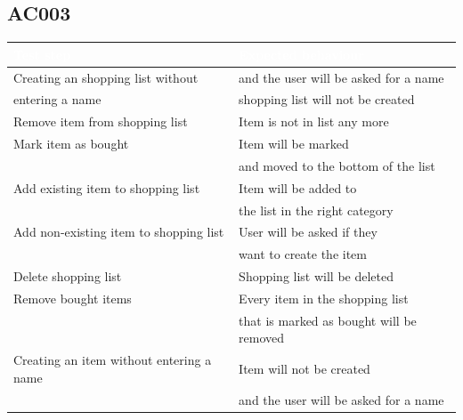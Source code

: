 \documentclass[12pt]{article}
\theoremstyle{definition}
\begin{document}
\subsection{AC003}

\begin{tabular}{|L{8cm}|L{8cm}|}
\hline
{}\textcolor{white}{Test step} & \textcolor{white}{Expected behaviour} \\ \hline
Creating an shopping list without & and the user will be asked for a name \\
entering a name & shopping list will not be created \\ 
  \hline
Remove item from shopping list & Item is not in list any more \\ \hline
Mark item as bought & Item will be marked \\
& and moved to the bottom of the list \\ \hline
Add existing item to shopping list & Item will be added to \\
& the list in the right category \\ \hline
Add non-existing item to shopping list & User will be asked if they \\
& want to create the item \\ \hline
Delete shopping list & Shopping list will be deleted \\ \hline
Remove bought items & Every item in the shopping list \\
& that is marked as bought will be removed \\ \hline
Creating an item without entering a name & Item will not be created \\ 
 & and the user will be asked for a name \\ \hline

\end{tabular}

\pagebreak
\end{document}

